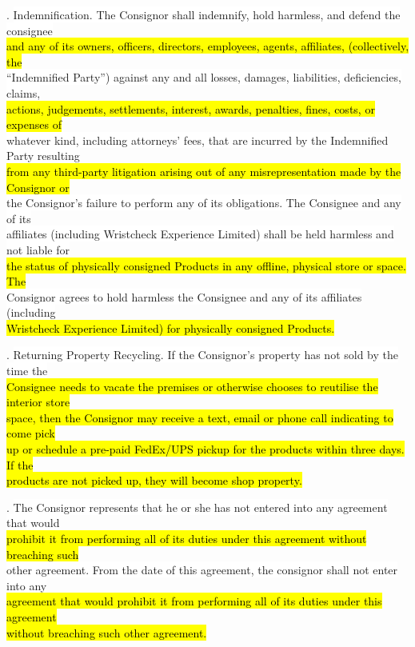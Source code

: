 \documentclass[12pt]{article}%
\begin{document}
{. \colorbox{white}{Indemnification. The Consignor shall indemnify, hold harmless, and defend the consignee} \\
\hl{and any of its owners, officers, directors, employees, agents, affiliates, (collectively, the}\\
\colorbox{white}{“Indemnified Party”) against any and all losses, damages, liabilities, deficiencies, claims, }\\
\hl{actions, judgements, settlements, interest, awards, penalties, fines, costs, or expenses of }\\
\colorbox{white}{whatever kind, including attorneys’ fees, that are incurred by the Indemnified Party resulting }\\
\hl{from any third-party litigation arising out of any misrepresentation made by the Consignor or} \\
\colorbox{white}{the Consignor’s failure to perform any of its obligations. The Consignee and any of its}\\
\colorbox{white}{affiliates (including Wristcheck Experience Limited) shall be held harmless and not liable for }\\
\hl{the status of physically consigned Products in any offline, physical store or space. The }\\
\colorbox{white}{Consignor agrees to hold harmless the Consignee and any of its affiliates (including} \\
\hl{Wristcheck Experience Limited) for physically consigned Products. }

. \colorbox{white}{Returning Property \/ Recycling. If the Consignor’s property has not sold by the time the}\\
\hl{Consignee needs to vacate the premises or otherwise chooses to reutilise the interior store }\\
\hl{space, then the Consignor may receive a text, email or phone call indicating to come pick }\\
\hl{up or schedule a pre-paid FedEx/UPS pickup for the products within three days. If the }\\
\hl{products are not picked up, they will become shop property. }

. \colorbox{white}{The Consignor represents that he or she has not entered into any agreement that would }\\
\hl{prohibit it from performing all of its duties under this agreement without breaching such} \\
\colorbox{white}{other agreement. From the date of this agreement, the consignor shall not enter into any} \\
\hl{agreement that would prohibit it from performing all of its duties under this agreement }\\
\hl{without breaching such other agreement. }

}
\end{document}
